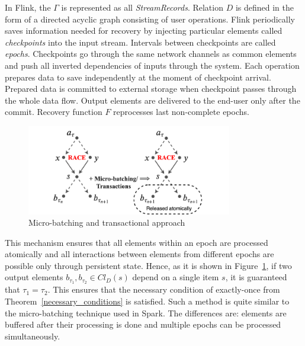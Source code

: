 In Flink, the  $\Gamma$ is represented as all {\em StreamRecords}. Relation $D$ is defined in the form of a directed acyclic graph consisting of user operations. 
Flink periodically saves information needed for recovery by injecting particular elements called {\em checkpoints} into the input stream. 
Intervals  between checkpoints are called {\em epochs}. Checkpoints go through the same network channels as common elements and push all inverted dependencies of inputs through the system. 
Each operation prepares data to save independently at the moment of checkpoint arrival. Prepared data is committed to external storage when checkpoint passes through the whole data flow. Output elements are delivered to the end-user only after the commit. 
Recovery function $F$ reprocesses last non-complete epochs.

\begin{figure}[t]
  \centering
  \includegraphics[width=0.8\textwidth]{Chapters/DeliveryGuarantees/pics/spark-flink.png}
  \caption{Micro-batching and transactional approach}
  \label{spark_flink}
\end{figure}

This mechanism ensures that all elements within an epoch are processed atomically and all interactions between elements from different epochs are possible only through persistent state. 
Hence, as it is shown in Figure~\ref{spark_flink},
 if two output elements $b_{\tau_1},b_{\tau_2} \in Cl_D(s)$ depend on a single item $s$, 
 it is guaranteed that $\tau_1=\tau_2$. 
This ensures that the necessary condition of exactly-once from Theorem~\ref{necessary_conditions} is satisfied. 
Such a method is quite similar to the micro-batching technique used in Spark. 
The differences are: elements are buffered after their processing is done and  multiple epochs can be processed simultaneously. 
